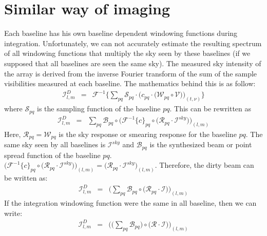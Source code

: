 \documentclass[useAMS,usenatbib]{mn2e}
\begin{document}
\section[]{Similar way of imaging}
\label{label:similarimaging}
Each baseline has his own baseline dependent windowing functions during integration. Unfortunately, we can not accurately estimate the 
resulting spectrum of all windowing functions that multiply the sky seen by these baselines (if we supposed that all baselines are seen the 
same sky). The measured sky intensity of the array is derived from the inverse Fourier transform of the sum of the sample visibilities 
measured at each baseline. The mathematics behind this is as follow:
\begin{eqnarray*}
 \mathcal{I}^{D}_{l,m}&=&\mathcal{F}^{-1}\Bigg\{\sum_{pq}\mathcal{S}_{pq}\cdot \Bigg(c_{pq}\cdot\big(\mathcal{W}_{pq}\circ 
\mathcal{V}\big)\Bigg)_{(t,\nu)}\Bigg\}
\end{eqnarray*}
where $\mathcal{S}_{pq}$ is the sampling function of the baseline $pq$.  This can be rewritten as
\begin{eqnarray*}
 \mathcal{I}^{D}_{l,m}&=&\sum_{pq}\mathcal{B}_{pq}\circ \Bigg(\mathcal{F}^{-1}\big\{c\big\}_{pq}\circ\big(\mathcal{R}_{pq}\cdot
\mathcal{I}^{sky}\big)\Bigg)_{(l,m)}
\end{eqnarray*}
Here, $\mathcal{R}_{pq}=\mathcal{W}_{pq}$ is the sky response or smearing response for the baseline $pq$. The same sky seen by all 
baselines is $\mathcal{I}^{sky}$ and $\mathcal{B}_{pq}$ is the synthesized beam or point spread function of the baseline $pq$. 
$\Bigg(\mathcal{F}^{-1}\big\{c\big\}_{pq}\circ\big(\mathcal{R}_{pq}\cdot \mathcal{I}^{sky}\big)\Bigg)_{(l,m)}= 
\big(\mathcal{R}_{pq}\cdot\mathcal{I}^{sky}\big)_{(l,m)}$. Therefore, the dirty beam can be written as: 
\begin{eqnarray*}
 \mathcal{I}^{D}_{l,m}&=&\Bigg(\sum_{pq}\mathcal{B}_{pq}\circ \bigg(\mathcal{R}_{pq}\cdot
\mathcal{I}\bigg)\Bigg)_{(l,m)}
\end{eqnarray*}
If the integration windowing function were the same in all baseline, then we can write:
\begin{eqnarray*}
 \mathcal{I}^{D}_{l,m}&=&\Bigg(\bigg(\sum_{pq}\mathcal{B}_{pq}\bigg)\circ \bigg(\mathcal{R}\cdot
\mathcal{I}\bigg)\Bigg)_{(l,m)}
\end{eqnarray*}
\end{document}
